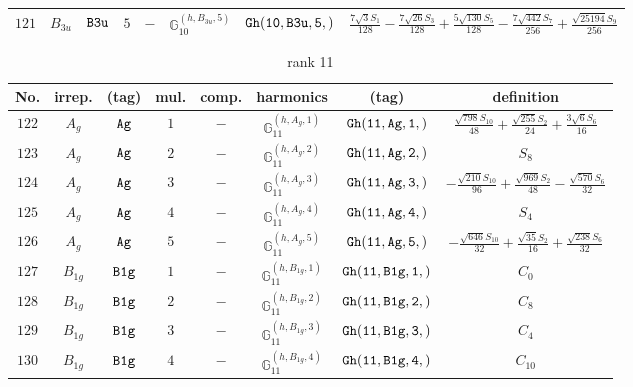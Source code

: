 \documentclass[fleqn,8pt]{jsarticle}
\begin{document}
\begin{table}[ht!]
\begin{center}
\begin{tabular}{cccccccc}
$ 121 $ & $ B_{3u} $ & $ {\tt B3u} $ & $ 5 $ & $ - $ & $ \mathbb{G}_{10}^{(h,B_{3u},5)} $ & $ {\tt Gh(10,B3u,5,)} $ & $ \frac{7 \sqrt{3} S_{1}}{128} - \frac{7 \sqrt{26} S_{3}}{128} + \frac{5 \sqrt{130} S_{5}}{128} - \frac{7 \sqrt{442} S_{7}}{256} + \frac{\sqrt{25194} S_{9}}{256} $ \\
 \hline \hline
\end{tabular}
\end{center}
\end{table}
\begin{table}[ht!]
\begin{center}
\caption{rank 11}
\renewcommand{\arraystretch}{1.3}
\begin{tabular}{cccccccc} \hline \hline
No. & irrep. & (tag) & mul. & comp. & harmonics & (tag) & definition \\ \hline
$ 122 $ & $ A_{g} $ & $ {\tt Ag} $ & $ 1 $ & $ - $ & $ \mathbb{G}_{11}^{(h,A_{g},1)} $ & $ {\tt Gh(11,Ag,1,)} $ & $ \frac{\sqrt{798} S_{10}}{48} + \frac{\sqrt{255} S_{2}}{24} + \frac{3 \sqrt{6} S_{6}}{16} $ \\
$ 123 $ & $ A_{g} $ & $ {\tt Ag} $ & $ 2 $ & $ - $ & $ \mathbb{G}_{11}^{(h,A_{g},2)} $ & $ {\tt Gh(11,Ag,2,)} $ & $ S_{8} $ \\
$ 124 $ & $ A_{g} $ & $ {\tt Ag} $ & $ 3 $ & $ - $ & $ \mathbb{G}_{11}^{(h,A_{g},3)} $ & $ {\tt Gh(11,Ag,3,)} $ & $ - \frac{\sqrt{210} S_{10}}{96} + \frac{\sqrt{969} S_{2}}{48} - \frac{\sqrt{570} S_{6}}{32} $ \\
$ 125 $ & $ A_{g} $ & $ {\tt Ag} $ & $ 4 $ & $ - $ & $ \mathbb{G}_{11}^{(h,A_{g},4)} $ & $ {\tt Gh(11,Ag,4,)} $ & $ S_{4} $ \\
$ 126 $ & $ A_{g} $ & $ {\tt Ag} $ & $ 5 $ & $ - $ & $ \mathbb{G}_{11}^{(h,A_{g},5)} $ & $ {\tt Gh(11,Ag,5,)} $ & $ - \frac{\sqrt{646} S_{10}}{32} + \frac{\sqrt{35} S_{2}}{16} + \frac{\sqrt{238} S_{6}}{32} $ \\
$ 127 $ & $ B_{1g} $ & $ {\tt B1g} $ & $ 1 $ & $ - $ & $ \mathbb{G}_{11}^{(h,B_{1g},1)} $ & $ {\tt Gh(11,B1g,1,)} $ & $ C_{0} $ \\
$ 128 $ & $ B_{1g} $ & $ {\tt B1g} $ & $ 2 $ & $ - $ & $ \mathbb{G}_{11}^{(h,B_{1g},2)} $ & $ {\tt Gh(11,B1g,2,)} $ & $ C_{8} $ \\
$ 129 $ & $ B_{1g} $ & $ {\tt B1g} $ & $ 3 $ & $ - $ & $ \mathbb{G}_{11}^{(h,B_{1g},3)} $ & $ {\tt Gh(11,B1g,3,)} $ & $ C_{4} $ \\
$ 130 $ & $ B_{1g} $ & $ {\tt B1g} $ & $ 4 $ & $ - $ & $ \mathbb{G}_{11}^{(h,B_{1g},4)} $ & $ {\tt Gh(11,B1g,4,)} $ & $ C_{10} $ \\

\end{tabular}
\end{center}
\end{table}
\end{document}
